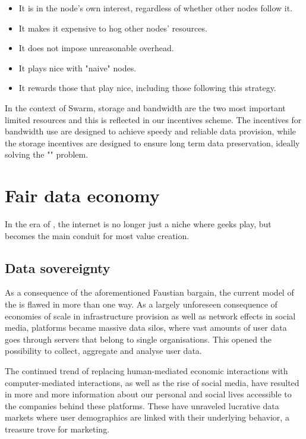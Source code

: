 \begin{itemize}
    \item It is in the node's own interest, regardless of whether other nodes follow it.
    \item It makes it expensive to hog other nodes' resources.
    \item It does not impose unreasonable overhead.
    \item It plays nice with "naive" nodes.
    \item It rewards those that play nice, including those following this strategy.
\end{itemize}

In the context of Swarm, storage and bandwidth are the two most important limited resources and this is reflected in our incentives scheme. The incentives for bandwidth use are designed to achieve speedy and reliable data provision, while the storage incentives are designed to ensure long term data preservation, ideally solving the "" problem.

\section{Fair data economy}\label{sec:fair-data}


In the era of , the internet is no longer just a niche where geeks play, but becomes the main conduit for most value creation. 

\subsection{Data sovereignty}\label{sec:data-sovereignty}

As a consequence of the aforementioned Faustian bargain, the current model of the  is flawed in more than one way. As a largely unforeseen consequence of economies of scale in infrastructure provision as well as network effects in social media, platforms became massive data silos, where vast amounts of user data goes through servers that belong to single organisations. This opened the possibility to collect, aggregate and analyse user data. 

The continued trend of replacing human-mediated economic interactions with computer-mediated interactions, as well as the rise of social media, have resulted in more and more information about our personal and social lives accessible to the companies behind these platforms. These have unraveled lucrative data markets where user demographics are linked with their underlying behavior, a treasure trove for marketing.

